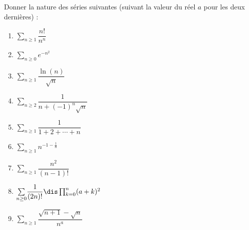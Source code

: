 \documentclass[a4paper,10pt]{report}
\newcommand{\Sum}[2]{\ensuremath{\textstyle{\sum\limits_{#1}^{#2}}}}
\begin{document}
\begin{Exa} Donner la nature des séries suivantes (suivant la valeur du réel $a$ pour les deux dernières) : 
\begin{multicols}{3}
\begin{enumerate}
\item $\Sum{n \geq 1}{} \dfrac{n!}{n^n} $
\item $\Sum{n \geq 0}{} e^{-n^2} $
\item $\Sum{n \geq 1}{} \dfrac{\ln(n)}{\sqrt{n}} $
\columnbreak
\item $\Sum{n \geq 2}{} \dfrac{1}{n+(-1)^n \sqrt{n}} $
\item $\Sum{n \geq 1}{} \dfrac{1}{1+2+ \cdots + n} $
\item $\Sum{n \geq 1}{} n^{-1- \frac{1}{n}} $
\columnbreak
\item $\Sum{n \geq 1}{}  \dfrac{n^2}{(n-1)!} $
\item $\Sum{n \geq 0}{} \dfrac{1}{(2n)!} \dis \prod_{k=0}^n (a+k)^2$ 
\item $\Sum{n \geq 1}{} \dfrac{\sqrt{n+1}-\sqrt{n}}{n^a}$ 
\end{enumerate}
\end{multicols}
\end{Exa}

\corr 
\end{document}
